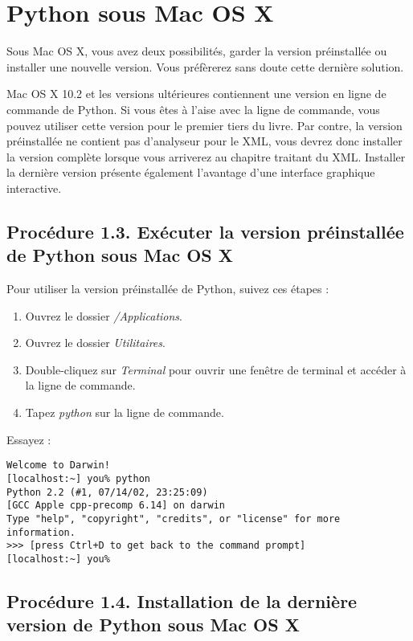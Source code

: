 \section{Python sous Mac OS X}\label{Python sous Mac OS X}

Sous Mac OS X, vous avez deux possibilités, garder la version préinstallée ou installer une nouvelle version. Vous préfèrerez sans doute cette dernière solution.

\medskip
Mac OS X 10.2 et les versions ultérieures contiennent une version en ligne de commande de Python. Si vous êtes à l'aise avec la ligne de commande, vous pouvez utiliser cette version pour le premier tiers du livre. Par contre, la version préinstallée ne contient pas d'analyseur pour le XML, vous devrez donc installer la version complète lorsque vous arriverez au chapitre traitant du XML. Installer la dernière version présente également l'avantage d'une interface graphique interactive.

\subsection*{Procédure 1.3. Exécuter la version préinstallée de Python sous Mac OS X}

Pour utiliser la version préinstallée de Python, suivez ces étapes :

\begin {enumerate}
    \item Ouvrez le dossier \emph{/Applications}.
    \item Ouvrez le dossier \emph{Utilitaires}.
    \item Double-cliquez sur \emph{Terminal} pour ouvrir une fenêtre de terminal et accéder à la ligne de commande.
    \item Tapez \emph{python} sur la ligne de commande.
\end{enumerate}

\medskip
\noindent Essayez :

\begin{lstlisting}[style=none]
Welcome to Darwin!
[localhost:~] you% python
Python 2.2 (#1, 07/14/02, 23:25:09)
[GCC Apple cpp-precomp 6.14] on darwin
Type "help", "copyright", "credits", or "license" for more information.
>>> [press Ctrl+D to get back to the command prompt]
[localhost:~] you%
\end{lstlisting}

\subsection*{Procédure 1.4. Installation de la dernière version de Python sous Mac OS X}

